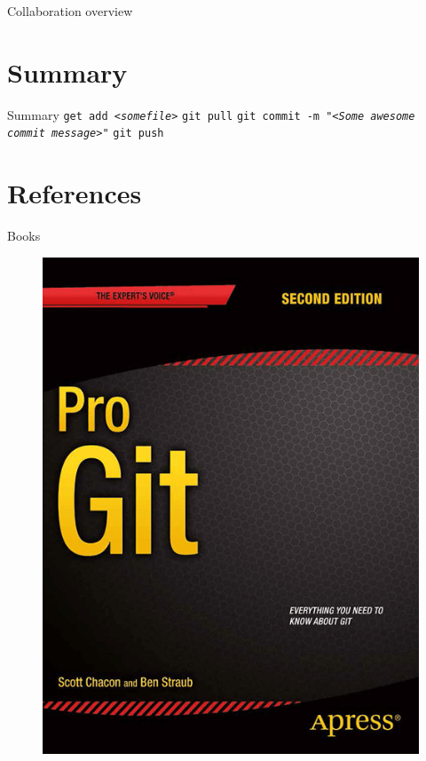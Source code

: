 \documentclass{beamer}
\begin{document}
\begin{frame}{Collaboration overview}
\end{frame}

\section{Summary}
\begin{frame}{Summary}
    \texttt{get add \em{<somefile>}} \newline
    \texttt{git pull} \newline
    \texttt{git commit -m \em{"<Some awesome commit message>"}} \newline
    \texttt{git push}
\end{frame}

\section{References}
\begin{frame}{Books}
    \begin{figure}
        \includegraphics[height=.6\textheight]{progit}
        \label{fig:book-progit}
    \end{figure}
\end{frame}
\end{document}
